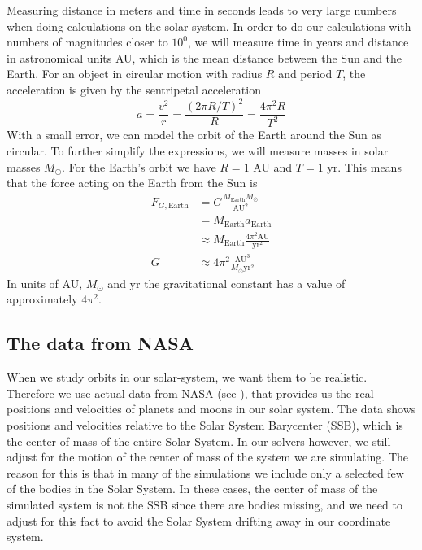 \documentclass[reprint, english,notitlepage,nofootinbib]{revtex4-1}  %
\begin{document}
Measuring distance in meters and time in seconds leads to very large numbers when doing calculations on the solar system. In order to do our calculations with numbers of magnitudes closer to $10^0$, we will measure time in years and distance in astronomical units AU, which is the mean distance between the Sun and the Earth. For an object in circular motion with radius $R$ and period $T$, the acceleration is given by the sentripetal acceleration
\begin{equation*}
  a = \frac{v^2}{r} = \frac{(2 \pi R / T)^2}{R} = \frac{4 \pi^2 R}{T^2}
\end{equation*}
With a small error, we can model the orbit of the Earth around the Sun as circular. To further simplify the expressions, we will measure masses in solar masses $M_\odot$. For the Earth's orbit we have $R = 1$ AU and $T = 1$ yr. This means that the force acting on the Earth from the Sun is
\begin{align*}
  F_{G, \text{Earth}} &= G \frac{M_{\text{Earth}} M_\odot}{\text{AU}^2} \\
  &= M_{\text{Earth}} a_{\text{Earth}} \\
  &\approx M_{\text{Earth}} \frac{4 \pi^2 \text{AU}}{\text{yr}^2} \\
  G &\approx 4 \pi^2 \frac{\text{AU}^3}{M_\odot \text{yr}^2}
\end{align*}
In units of AU, $M_\odot$ and yr the gravitational constant has a value of approximately $4 \pi^2$.


\subsection{The data from NASA}

When we study orbits in our solar-system, we want them to be realistic. Therefore we use actual data from NASA (see \citep{NASA}), that provides us the real positions and velocities of planets and moons in our solar system. The data shows positions and velocities relative to the Solar System Barycenter (SSB), which is the center of mass of the entire Solar System. In our solvers however, we still adjust for the motion of the center of mass of the system we are simulating. The reason for this is that in many of the simulations we include only a selected few of the bodies in the Solar System. In these cases, the center of mass of the simulated system is not the SSB since there are bodies missing, and we need to adjust for this fact to avoid the Solar System drifting away in our coordinate system.
\end{document}
